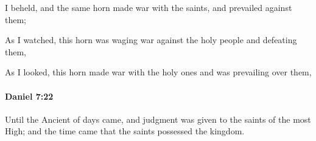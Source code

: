 			\begin{versebox}
					\item[BHS] 
					\item[LXX] 
					\item[ASV] I beheld, and the same horn made war with the saints, and prevailed against them;
					\item[NIV] As I watched, this horn was waging war against the holy people and defeating them,
					\item[NRSV] As I looked, this horn made war with the holy ones and was prevailing over them,
			\end{versebox}

		\paragraph{Daniel 7:22} %
			\label{DANIEL-7-22}

			Until the Ancient of days came, and judgment was given to the saints of the most High; and the time came that the saints possessed the kingdom.

